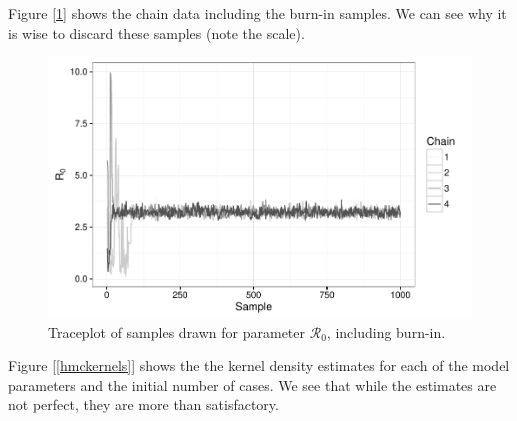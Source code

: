 	Figure [\ref{traceplot2}] shows the chain data including the burn-in samples. We can see why it is wise to discard these samples (note the scale).

    \begin{figure}
        \centering
        \captionsetup{width=0.8\linewidth}
        \includegraphics[width=\textwidth]{./images/traceplotR0_inc.pdf}
        \caption{Traceplot of samples drawn for parameter $\mathcal{R}_0$, including burn-in. \label{traceplot2}}
    \end{figure}

    Figure [\ref{hmckernels}] shows the the kernel density estimates for each of the model parameters and the initial number of cases. We see that while the estimates are not perfect, they are more than satisfactory.

